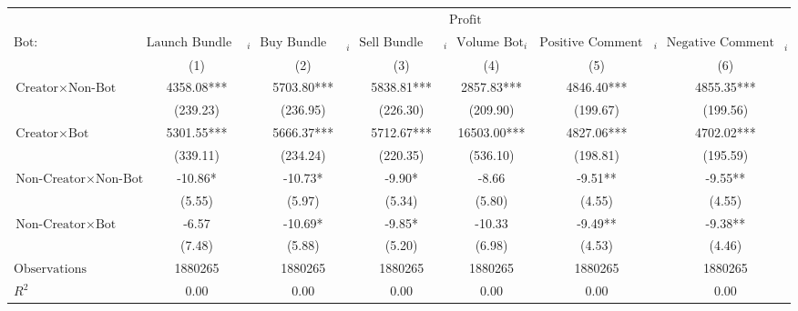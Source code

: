 \begin{tabular}{lcccccc}
\hline
 & \multicolumn{6}{c}{$\text{Profit}$} \\
 $\text{Bot}:$ & $\text{Launch Bundle Bot}_{i}$ & $\text{Buy Bundle Bot}_{i}$ & $\text{Sell Bundle Bot}_{i}$ & $\text{Volume Bot}_{i}$ & $\text{Positive Comment Bot}_{i}$ & $\text{Negative Comment Bot}_{i}$ \\
 & (1) & (2) & (3) & (4) & (5) & (6)\\
\hline
$\text{Creator} \times \text{Non-Bot}$ & 4358.08*** & 5703.80*** & 5838.81*** & 2857.83*** & 4846.40*** & 4855.35*** \\
 & (239.23) & (236.95) & (226.30) & (209.90) & (199.67) & (199.56) \\
$\text{Creator} \times \text{Bot}$ & 5301.55*** & 5666.37*** & 5712.67*** & 16503.00*** & 4827.06*** & 4702.02*** \\
 & (339.11) & (234.24) & (220.35) & (536.10) & (198.81) & (195.59) \\
$\text{Non-Creator} \times \text{Non-Bot}$ & -10.86* & -10.73* & -9.90* & -8.66 & -9.51** & -9.55** \\
 & (5.55) & (5.97) & (5.34) & (5.80) & (4.55) & (4.55) \\
$\text{Non-Creator} \times \text{Bot}$ & -6.57 & -10.69* & -9.85* & -10.33 & -9.49** & -9.38** \\
 & (7.48) & (5.88) & (5.20) & (6.98) & (4.53) & (4.46) \\
$\text{Observations}$ & 1880265 & 1880265 & 1880265 & 1880265 & 1880265 & 1880265 \\
$R^2$ & 0.00 & 0.00 & 0.00 & 0.00 & 0.00 & 0.00 \\
\hline
\end{tabular}